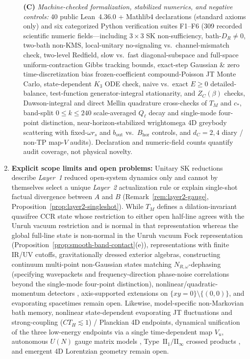 \documentclass[11pt,a4paper]{article}
\theoremstyle{definition}
\theoremstyle{remark}
\newcommand{\1}{\mathbf{1}}
\newcommand{\code}[1]{{\scriptsize\ttfamily #1}}
\begin{document}
\begin{enumerate}
\begin{itemize}
    \item[\textbf{(C)}] \emph{Machine-checked formalization, stabilized numerics, and negative controls:} 40 public Lean~4.36.0 + Mathlib4 declarations (standard axioms only) and six categorized Python verification suites F1--F6 (309 recorded scientific numeric fields---including $3\times 3$ SK non-sufficiency, bath-$D_R\neq 0$, two-bath non-KMS, local-unitary no-signaling vs.\ channel-mismatch check, two-level Redfield, slow vs.\ fast diagonal-subspace and full-space uniform-contraction Gibbs tracking bounds, exact-step Gaussian \& zero time-discretization bias frozen-coefficient compound-Poisson JT Monte Carlo, state-dependent $K_3$ ODE check, naive vs.\ exact $E\ge 0$ detailed-balance, test-function generator-integral stationarity, and $Z_C(\beta)$ checks, Dawson-integral and direct Mellin quadrature cross-checks of $T_M$ and $c_*$, band-split $0\le k\le 240$ scale-averaged $Q_\ell$ decay and single-mode four-point distinction, near-horizon-stabilized \code{wrightomega} 4D greybody scattering with fixed-$\omega r_s$ and $b_{\mathrm{out}}$ vs.\ $B_{\mathrm{hor}}$ controls, and $d_C=2,4$ diary / non-TP map-$V$ audits). Declaration and numeric-field counts quantify audit coverage, not physical novelty.
  \end{itemize}
  \item \textbf{Explicit scope limits and open problems:} Unitary SK reductions describe \emph{Layer~1} reduced open-system dynamics only and cannot by themselves select a unique \emph{Layer~2} actualization rule or explain single-shot factual divergence between $A$ and $B$ (Remark~\ref{rem:layer2-gauge}, Proposition~\ref{prop:layer2-singleshot}). While $T_M$ defines a dilation-invariant quasifree CCR state \cite{ArakiShiraishi1971} whose restriction to either open half-line agrees with the Unruh vacuum restriction and is normal in that representation whereas the global full-line state is non-normal in the Unruh vacuum Fock representation (Proposition~\ref{prop:smooth-band-contact}(e)), representations with finite IR/UV cutoffs, gravitationally dressed exterior algebras, constructing continuum multi-point non-Gaussian states matching $N_{R,\omega}$-dephasing (specifying wavepackets and frequency-direction phase-noise correlations beyond the single-mode four-point distinction), nonlinear/quadratic-momentum detectors \cite{Zambianco2026}, axis-supported extensions on $\{xy=0\}\setminus\{(0,0)\}$, and evaporating spacetimes remain open. Likewise, model-specific non-Markovian bath memory, nonlinear state-dependent evaporating JT fluctuations and strong-coupling ($CT_H\lesssim 1$) / Planckian 4D endpoints, dynamical unification of the three low-energy endpoints via a single time-dependent map $V_u$, autonomous $U(N)$ gauge matrix models \cite{BFSS1997,IKKT1997}, Type~$\mathrm{II}_1/\mathrm{II}_\infty$ crossed products \cite{CLPW2023,DeVuyst2025}, and emergent 4D Lorentzian geometry remain open.
\end{enumerate}
\end{document}
